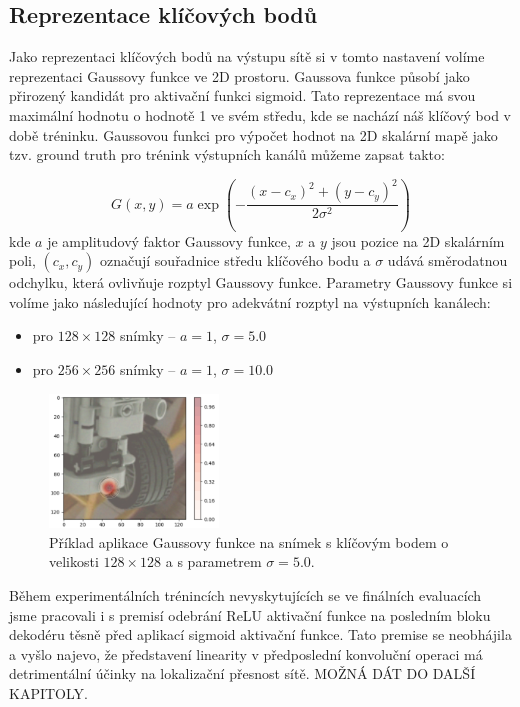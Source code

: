 \subsection{Reprezentace klíčových bodů}

Jako reprezentaci klíčových bodů na výstupu sítě si v tomto nastavení volíme reprezentaci Gaussovy funkce ve 2D prostoru. Gaussova funkce působí jako přirozený kandidát pro aktivační funkci sigmoid. Tato reprezentace má svou maximální hodnotu o hodnotě 1 ve svém středu, kde se nachází náš klíčový bod v době tréninku. Gaussovou funkci pro výpočet hodnot na 2D skalární mapě jako tzv. ground truth pro trénink výstupních kanálů můžeme zapsat takto:

\begin{equation}
    G(x, y) = a \exp\left(-\frac{(x - c_x)^2 + (y - c_y)^2}{2\sigma^2}\right)
\end{equation}
kde $a$ je amplitudový faktor Gaussovy funkce, $x$ a $y$ jsou pozice na 2D skalárním poli, $(c_x, c_y)$ označují souřadnice středu klíčového bodu a $\sigma$ udává směrodatnou odchylku, která ovlivňuje rozptyl Gaussovy funkce. Parametry Gaussovy funkce si volíme jako následující hodnoty pro adekvátní rozptyl na výstupních kanálech: 
\begin{itemize}
    \item pro $128 \times 128$ snímky -- $a=1$, $\sigma=5.0$
    \item pro $256 \times 256$ snímky -- $a=1$, $\sigma=10.0$
\end{itemize}

\begin{figure}[H]
\centering
\includegraphics[width=0.4\textwidth,keepaspectratio]{Figures/kp_gaussian.png}
\caption[Příklad aplikace Gaussovy funkce na snímek s klíčovým bodem]{Příklad aplikace Gaussovy funkce na snímek s klíčovým bodem o velikosti $128\times128$ a s parametrem $\sigma=5.0$.}

\label{fig:unetpp}
\end{figure}

Během experimentálních trénincích nevyskytujících se ve finálních evaluacích jsme pracovali i s premisí odebrání ReLU aktivační funkce na posledním bloku dekodéru těsně před aplikací sigmoid aktivační funkce. Tato premise se neobhájila a vyšlo najevo, že představení linearity v předposlední konvoluční operaci má detrimentální účinky na lokalizační přesnost sítě. MOŽNÁ DÁT DO DALŠÍ KAPITOLY.
\endinput
